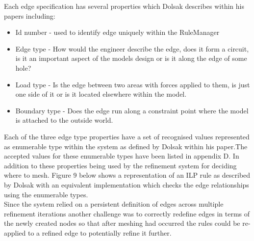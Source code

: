 \noindent
Each edge specification has several properties which Dolsak describes within his papers including:
\begin{itemize}
\item Id number - used to identify edge uniquely within the RuleManager 
\item Edge type - How would the engineer describe the edge, does it form a circuit, is it an important aspect of the models design or is it along the edge of some hole?
\item Load type - Is the edge between two areas with forces applied to them, is just one side of it or is it located elsewhere within the model.
\item Boundary type - Does the edge run along a constraint point where the model is attached to the outside world.


\end{itemize}

\noindent
Each of the three edge type properties have a set of recognised values represented as enumerable type within the system as defined by Dolsak within his paper.The accepted values for these enumerable types have been listed in appendix D. In addition to these properties being used by the refinement system for deciding where to mesh. Figure 9 below shows a representation of an ILP rule as described by Dolsak with an equivalent implementation which checks the edge relationships using the enumerable types. \\


\noindent
Since the system relied on a persistent definition of edges across multiple refinement iterations another challenge was to correctly redefine edges in terms of the newly created nodes so that after meshing had occurred the rules could be re-applied to a refined edge to potentially refine it further. \\


